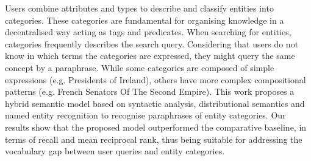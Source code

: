 Users combine attributes and types to describe and classify entities into categories. These categories are fundamental for organising knowledge in a decentralised way acting as tags and predicates. When searching for entities, categories frequently describes the search query. Considering that users do not know in which terms the categories are expressed, they might query the same concept by a paraphrase. While some categories are composed of simple expressions (e.g. Presidents of Ireland), others have more complex compositional patterns (e.g. French Senators Of The Second Empire). This work proposes a hybrid semantic model based on syntactic analysis, distributional semantics and named entity recognition to recognise paraphrases of entity categories. Our results show that the proposed model outperformed the comparative baseline, in terms of recall and mean reciprocal rank, thus being suitable for addressing the vocabulary gap between user queries and entity categories.
